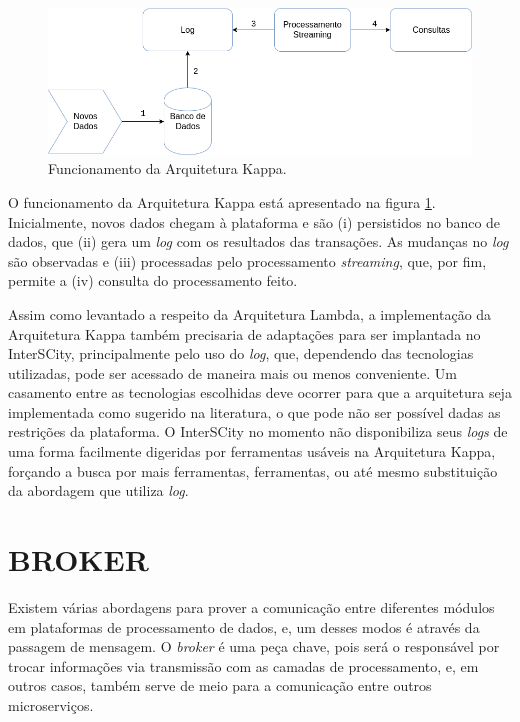 \newpage

\begin{figure}
  \centering
    \includegraphics[scale=0.5]{figuras/kappa_architecture.png}
  \caption{Funcionamento da Arquitetura Kappa.}
  \label{fig:kappa-lifecycle}
\end{figure}

O funcionamento da Arquitetura Kappa está apresentado na figura
\ref{fig:kappa-lifecycle}. Inicialmente, novos dados chegam à plataforma e são
(i) persistidos no banco de dados, que (ii) gera um \textit{log} com os
resultados das transações. As mudanças no \textit{log} são observadas e
(iii) processadas pelo processamento \textit{streaming}, que, por fim, permite
a (iv) consulta do processamento feito.

Assim como levantado a respeito da Arquitetura Lambda, a implementação da
Arquitetura Kappa também precisaria de adaptações para ser implantada no
InterSCity, principalmente pelo uso do \textit{log}, que, dependendo das
tecnologias utilizadas, pode ser acessado de maneira mais ou menos conveniente.
Um casamento entre as tecnologias escolhidas deve ocorrer para que a
arquitetura seja implementada como sugerido na literatura, o que pode não ser
possível dadas as restrições da plataforma. O InterSCity no momento não
disponibiliza seus \textit{logs} de uma forma facilmente digeridas por
ferramentas usáveis na Arquitetura Kappa, forçando a busca por mais ferramentas,
ferramentas, ou até mesmo substituição da abordagem que utiliza \textit{log}.

\section{BROKER}

Existem várias abordagens para prover a comunicação entre diferentes módulos em
plataformas de processamento de dados, e, um desses modos é através da passagem
de mensagem. O \textit{broker} é uma peça chave, pois será o responsável por
trocar informações via transmissão com as camadas de processamento, e, em outros
casos, também serve de meio para a comunicação entre outros
microserviços\cite{marz2015}.

